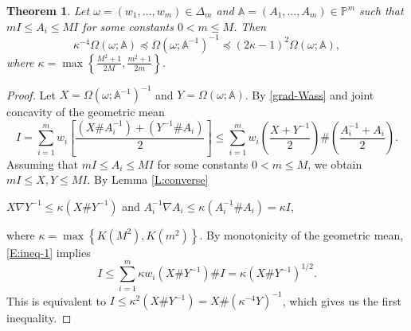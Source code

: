 \documentclass[12pt,reqno]{amsart}
\newtheorem{theorem}{Theorem}[section]
\begin{document}
\begin{theorem}
Let $\omega = (w_{1}, \dots, w_{m}) \in \Delta_{m}$ and $\mathbb{A} = (A_1, \ldots, A_m) \in \mathbb{P}^m$ such that $m I \leq A_{i} \leq M I$ for some constants $0 < m \leq M$. Then
\begin{displaymath}
\kappa^{-4} \Omega(\omega; \mathbb{A}) \preceq \Omega(\omega; \mathbb{A}^{-1})^{-1} \preceq (2 \kappa - 1)^{2} \Omega(\omega; \mathbb{A}),
\end{displaymath}
where $\displaystyle \kappa = \max \left\{ \frac{M^{2} + 1}{2 M}, \frac{m^{2} + 1}{2 m} \right\}$.
\end{theorem}


\begin{proof}
Let $X = \Omega(\omega; \mathbb{A}^{-1})^{-1}$ and $Y = \Omega(\omega; \mathbb{A})$.
By \eqref{grad-Wass} and joint concavity of the geometric mean
\begin{equation} \label{E:ineq-1}
I = \sum_{i=1}^{m} w_{i} \left[ \frac{(X \# A_{i}^{-1}) + (Y^{-1} \# A_{i})}{2} \right]
\leq \sum_{i=1}^{m} w_{i} \left( \frac{X + Y^{-1}}{2} \right) \# \left( \frac{A_{i}^{-1} + A_{i}}{2} \right).
\end{equation}
Assuming that $m I \leq A_{i} \leq M I$ for some constants $0 < m \leq M$, we obtain $m I \leq X, Y \leq M I$. By Lemma \ref{L:converse}
\begin{center}
$X \nabla Y^{-1} \leq \kappa (X \# Y^{-1})$ \quad and \quad $A_{i}^{-1} \nabla A_{i} \leq \kappa (A_{i}^{-1} \# A_{i}) = \kappa I$,
\end{center}
where $\displaystyle \kappa = \max \left\{ K(M^{2}), K(m^{2}) \right\}$.
By monotonicity of the geometric mean, \eqref{E:ineq-1} implies
\begin{displaymath}
I \leq \sum_{i=1}^{m} \kappa w_{i} (X \# Y^{-1}) \# I = \kappa (X \# Y^{-1})^{1/2}.
\end{displaymath}
This is equivalent to $I \leq \kappa^{2} (X \# Y^{-1}) = X \# (\kappa^{-4} Y)^{-1}$, which gives us the first inequality.


\end{proof}
\end{document}
